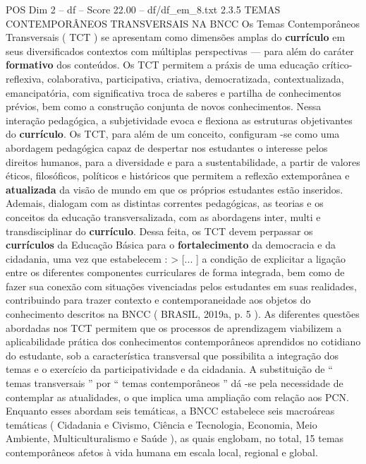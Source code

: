 \begin{textsample}{POS Dim 2 – df – Score 22.00 – df/df\_em\_8.txt}  \label{ex:f2_pos_124}
2.3.5 TEMAS CONTEMPORÂNEOS TRANSVERSAIS NA BNCC Os Temas Contemporâneos Transversais ( TCT ) se apresentam como dimensões amplas do \textbf{currículo} em seus diversificados contextos com múltiplas perspectivas — para além do caráter \textbf{formativo} dos conteúdos.
Os TCT permitem a práxis de uma educação crítico-reflexiva, colaborativa, participativa, criativa, democratizada, contextualizada, emancipatória, com significativa troca de saberes e partilha de conhecimentos prévios, bem como a construção conjunta de novos conhecimentos.
Nessa interação pedagógica, a subjetividade evoca e flexiona as estruturas objetivantes do \textbf{currículo}.
Os TCT, para além de um conceito, configuram -se como uma abordagem pedagógica capaz de despertar nos estudantes o interesse pelos direitos humanos, para a diversidade e para a sustentabilidade, a partir de valores éticos, filosóficos, políticos e históricos que permitem a reflexão extemporânea e \textbf{atualizada} da visão de mundo em que os próprios estudantes estão inseridos.
Ademais, dialogam com as distintas correntes pedagógicas, as teorias e os conceitos da educação transversalizada, com as abordagens inter, multi e transdisciplinar do \textbf{currículo}.
Dessa feita, os TCT devem perpassar os \textbf{currículos} da Educação Básica para o \textbf{fortalecimento} da democracia e da cidadania, uma vez que estabelecem : > [... ] a condição de explicitar a ligação entre os diferentes componentes curriculares de forma integrada, bem como de fazer sua conexão com situações vivenciadas pelos estudantes em suas realidades, contribuindo para trazer contexto e contemporaneidade aos objetos do conhecimento descritos na BNCC ( BRASIL, 2019a, p. 5 ).
As diferentes questões abordadas nos TCT permitem que os processos de aprendizagem viabilizem a aplicabilidade prática dos conhecimentos contemporâneos aprendidos no cotidiano do estudante, sob a característica transversal que possibilita a integração dos temas e o exercício da participatividade e da cidadania.
A substituição de “ temas transversais ” por “ temas contemporâneos ” dá -se pela necessidade de contemplar as atualidades, o que implica uma ampliação com relação aos PCN.
Enquanto esses abordam seis temáticas, a BNCC estabelece seis macroáreas temáticas ( Cidadania e Civismo, Ciência e Tecnologia, Economia, Meio Ambiente, Multiculturalismo e Saúde ), as quais englobam, no total, 15 temas contemporâneos afetos à vida humana em escala local, regional e global.

\end{textsample}
